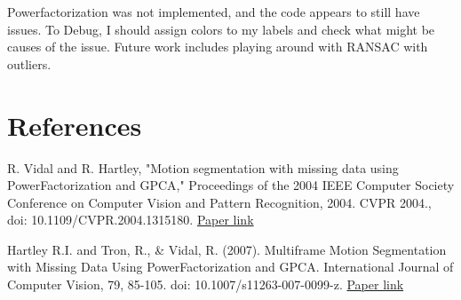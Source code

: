 \documentclass[a4paper]{article}
\begin{document}
Powerfactorization was not implemented, and the code appears to still have issues. To Debug, I should assign colors to my labels and check what might
be causes of the issue.  Future work includes playing around with RANSAC with outliers.


\section{References}

 
R. Vidal and R. Hartley, "Motion segmentation with missing data using PowerFactorization and GPCA," Proceedings of the 2004 IEEE Computer Society
Conference on Computer Vision and Pattern Recognition, 2004. CVPR 2004., doi: 10.1109/CVPR.2004.1315180.
\href{http://vision.jhu.edu/assets/VidalCVPR04.pdf}{Paper link}

\bigskip

\noindent Hartley R.I. and Tron, R., \& Vidal, R. (2007). Multiframe Motion Segmentation with Missing Data Using PowerFactorization and GPCA.
International Journal of Computer Vision, 79, 85-105. doi: 10.1007/s11263-007-0099-z.
\href{https://pdfs.semanticscholar.org/322b/3feffe79585c112c6a0d86c05909634ac7c5.pdf}{Paper link}





\end{document}
